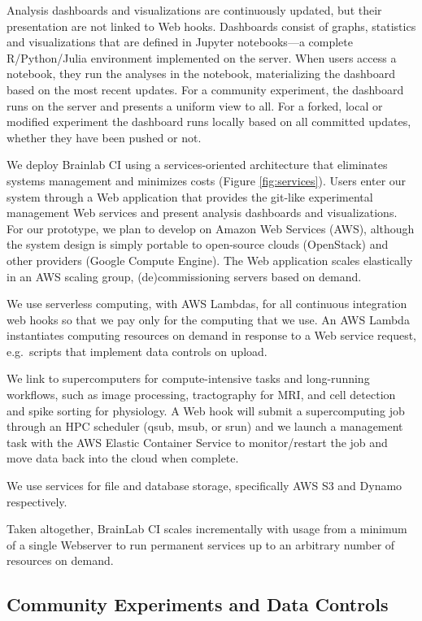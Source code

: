 Analysis dashboards and visualizations are continuously updated, but their presentation are 
not linked to Web hooks.  Dashboards consist of graphs, statistics and visualizations
that are defined in Jupyter notebooks---a complete R/Python/Julia environment implemented
on the server.  When users access a notebook, they run the analyses in the notebook, materializing
the dashboard based on the most recent updates.  For a community experiment, the dashboard runs 
on the server and presents a uniform view to all.  For a forked, local or modified experiment the
dashboard runs locally based on all committed updates, whether they have been pushed or not.
 
%
We deploy Brainlab CI using a services-oriented architecture that eliminates systems
management and minimizes costs (Figure \ref{fig:services}).  Users enter our system 
through a Web application that provides the git-like experimental management Web services
and present analysis dashboards and visualizations.   For our prototype, we 
plan to develop on Amazon Web Services (AWS), although the system design is simply
portable to open-source clouds (OpenStack) and other providers (Google Compute Engine). 
The Web application scales elastically in an AWS scaling group, 
(de)commissioning servers based on demand.

We use serverless computing, with AWS Lambdas, for all continuous integration web hooks so that we
pay only for the computing that we use.  An AWS Lambda instantiates computing resources
on demand in response to a Web service request, e.g.~scripts that implement data controls 
on upload.

We link to supercomputers for compute-intensive tasks and long-running workflows, 
such as image processing, tractography for MRI, and cell detection and spike sorting for physiology.  
A Web hook will submit a supercomputing job
through an HPC scheduler (qsub, msub, or srun) and we launch a management task with 
the AWS Elastic Container Service to monitor/restart the job and move data back into the cloud when complete.

We use services for file and database storage, specifically AWS S3 and Dynamo respectively.

Taken altogether, BrainLab CI scales incrementally with usage from a minimum of 
a single Webserver to run permanent services up to an arbitrary number of resources on demand.


\subsection{Community Experiments and Data Controls}

